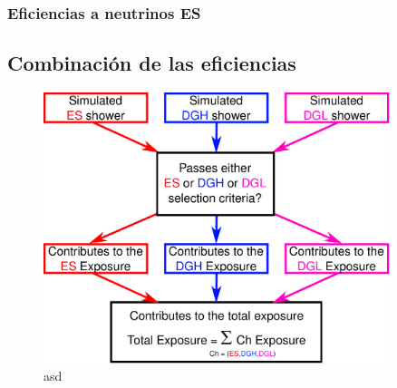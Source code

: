 	
	\subsubsection{Eficiencias a neutrinos ES}
	
	\subsection{Combinaci\'on de las eficiencias}
	
	\begin{figure}[h!]
		\begin{center}
			\includegraphics[width=0.9\textwidth]{fig/resultadosAuger/sketch_combined_4}
			\caption{asd}
			\label{fig:sketch_combined_4}
		\end{center}
	\end{figure}
	
% 
% 
	
